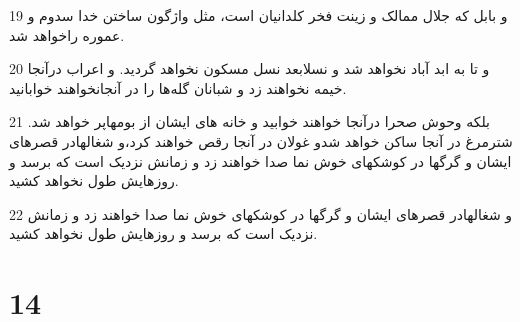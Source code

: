 \par 19 و بابل که جلال ممالک و زینت فخر کلدانیان است، مثل واژگون ساختن خدا سدوم و عموره راخواهد شد.
\par 20 و تا به ابد آباد نخواهد شد و نسلابعد نسل مسکون نخواهد گردید. و اعراب درآنجا خیمه نخواهند زد و شبانان گله‌ها را در آنجانخواهند خوابانید.
\par 21 بلکه وحوش صحرا درآنجا خواهند خوابید و خانه های ایشان از بومهاپر خواهد شد. شترمرغ در آنجا ساکن خواهد شدو غولان در آنجا رقص خواهند کرد،و شغالهادر قصرهای ایشان و گرگها در کوشکهای خوش نما صدا خواهند زد و زمانش نزدیک است که برسد و روزهایش طول نخواهد کشید.
\par 22 و شغالهادر قصرهای ایشان و گرگها در کوشکهای خوش نما صدا خواهند زد و زمانش نزدیک است که برسد و روزهایش طول نخواهد کشید.
 
\chapter{14}

